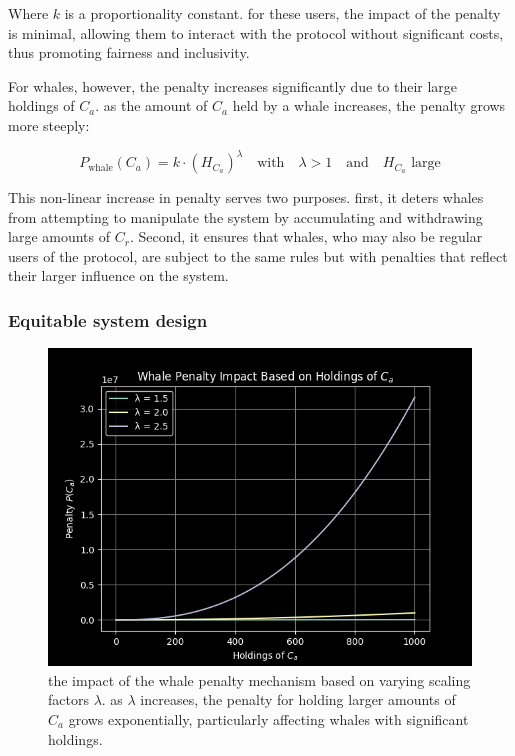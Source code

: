 \documentclass{article}
\begin{document}
Where $k$ is a proportionality constant. for these users, the impact of the penalty is minimal, allowing them to interact with the protocol without significant costs, thus promoting fairness and inclusivity.

For whales, however, the penalty increases significantly due to their large holdings of $C_a$. as the amount of $C_a$ held by a whale increases, the penalty grows more steeply:

\[
P_{\text{whale}}(C_a) = k \cdot \left(H_{C_a}\right)^\lambda \quad \text{with} \quad \lambda > 1 \quad \text{and} \quad H_{C_a} \text{ large}
\]

This non-linear increase in penalty serves two purposes. first, it deters whales from attempting to manipulate the system by accumulating and withdrawing large amounts of $C_r$. Second, it ensures that whales, who may also be regular users of the protocol, are subject to the same rules but with penalties that reflect their larger influence on the system.

\subsubsection{Equitable system design}

\begin{figure}[h]
\centering
\includegraphics[width=\textwidth]{images/6.png}
\caption{the impact of the whale penalty mechanism based on varying scaling factors $\lambda$. as $\lambda$ increases, the penalty for holding larger amounts of $C_a$ grows exponentially, particularly affecting whales with significant holdings.}
\label{fig:whale_penalty}
\end{figure}
\end{document}
